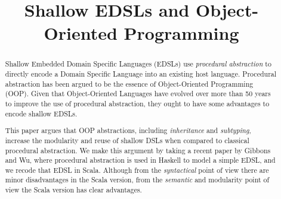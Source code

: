 \documentclass[10pt,preprint,nocopyrightspace]{sigplanconf}
\begin{document}
\setlength{\pdfpageheight}{\paperheight}
\setlength{\pdfpagewidth}{\paperwidth}




\title{Shallow EDSLs and Object-Oriented Programming}

\authorinfo{}
           {}
           {}

\maketitle

\begin{abstract}

Shallow Embedded Domain Specific Languages (EDSLs) use
\emph{procedural abstraction} to directly encode a Domain Specific
Language into an existing host language. Procedural abstraction has
been argued to be the essence of Object-Oriented Programming (OOP). Given
that Object-Oriented Languages have evolved over more than 50 years
to improve the use of procedural abstraction, they ought to have some
advantages to encode shallow EDSLs.

This paper argues that OOP abstractions, including \emph{inheritance}
and \emph{subtyping}, increase the modularity and reuse of shallow
DSLs when compared to classical procedural abstraction. We make this
argument by taking a recent paper by Gibbons and Wu, where procedural
abstraction is used in Haskell to model a simple EDSL, and we recode
that EDSL in Scala. Although from the \emph{syntactical} point of view
there are minor disadvantages in the Scala version, from the \emph{semantic}
and modularity point of view the Scala version has clear advantages.
\end{abstract}
\end{document}
